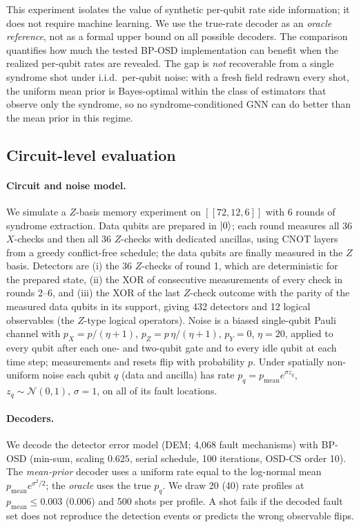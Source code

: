 \documentclass[a4paper,twocolumn,11pt,nopdfoutputerror]{quantumarticle}
\newcommand{\code}[3]{\ensuremath{[\![#1,#2,#3]\!]}}
\begin{document}
This experiment isolates the value of synthetic per-qubit rate side
information; it does not require machine learning. We use the true-rate
decoder as an \emph{oracle reference}, not as a formal upper bound on all
possible decoders. The comparison quantifies how much the tested BP-OSD
implementation can benefit when the realized per-qubit rates are
revealed. The gap is \emph{not}
recoverable from a single syndrome shot under i.i.d.\ per-qubit
noise: with a fresh field redrawn every shot, the uniform mean
prior is Bayes-optimal within the class of estimators that observe
only the syndrome, so no syndrome-conditioned GNN can do better
than the mean prior in this regime.

\subsection{Circuit-level evaluation}\label{sec:circuit}

\paragraph{Circuit and noise model.}
We simulate a $Z$-basis memory experiment on $\code{72}{12}{6}$ with
6 rounds of syndrome extraction. Data qubits are prepared in $\ket{0}$;
each round measures all 36 $X$-checks and then all 36 $Z$-checks with
dedicated ancillas, using CNOT layers from a greedy conflict-free schedule;
the data qubits are finally measured in the $Z$ basis. Detectors are
(i) the 36 $Z$-checks of round 1, which are deterministic for the prepared
state, (ii) the XOR of consecutive measurements of every check in rounds
2--6, and (iii) the XOR of the last $Z$-check outcome with the parity of the
measured data qubits in its support, giving 432 detectors and 12 logical
observables (the $Z$-type logical operators). Noise is a biased single-qubit
Pauli channel with $p_X=p/(\eta+1)$, $p_Z=p\,\eta/(\eta+1)$, $p_Y=0$,
$\eta=20$, applied to every qubit after each one- and two-qubit gate and to
every idle qubit at each time step; measurements and resets flip with
probability $p$. Under spatially non-uniform noise each qubit $q$ (data and
ancilla) has rate $p_q=p_\mathrm{mean}e^{\sigma z_q}$, $z_q\sim\mathcal N(0,1)$,
$\sigma=1$, on all of its fault locations.

\paragraph{Decoders.}
We decode the detector error model (DEM; 4{,}068 fault mechanisms) with
BP-OSD (min-sum, scaling $0.625$, serial schedule, 100 iterations, OSD-CS
order 10). The \emph{mean-prior} decoder uses a uniform rate equal to the
log-normal mean $p_\mathrm{mean}e^{\sigma^2/2}$; the \emph{oracle} uses the
true $p_q$. We draw 20 (40) rate profiles at $p_\mathrm{mean}\le0.003$
($0.006$) and 500 shots per profile. A shot fails if the decoded fault set
does not reproduce the detection events or predicts the wrong observable flips.
\end{document}
